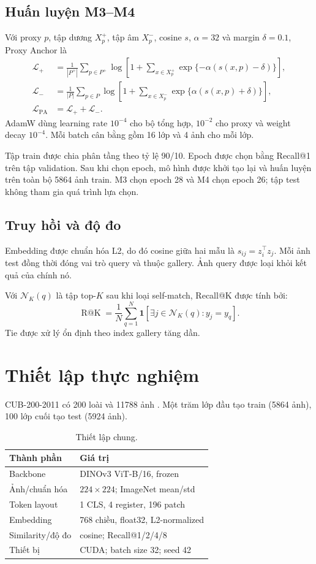 \documentclass[11pt,a4paper]{article}
\makeatletter
\newcommand{\Rk}{\operatorname{R@K}}
\makeatother
\begin{document}
\subsection{Huấn luyện M3--M4}
Với proxy $p$, tập dương $X_p^+$, tập âm $X_p^-$, cosine $s$, $\alpha=32$ và margin $\delta=0.1$, Proxy Anchor là
\begin{align}
\mathcal{L}_{+}
&=\frac{1}{|P^+|}\sum_{p\in P^+}\log\left[1+\sum_{x\in X_p^+}\exp\{-\alpha(s(x,p)-\delta)\}\right],\\
\mathcal{L}_{-}
&=\frac{1}{|P|}\sum_{p\in P}\log\left[1+\sum_{x\in X_p^-}\exp\{\alpha(s(x,p)+\delta)\}\right],\\
\mathcal{L}_{\mathrm{PA}}&=\mathcal{L}_{+}+\mathcal{L}_{-}.
\end{align}
AdamW dùng learning rate $10^{-4}$ cho bộ tổng hợp, $10^{-2}$ cho proxy và weight decay $10^{-4}$. Mỗi batch cân bằng gồm 16 lớp và 4 ảnh cho mỗi lớp.

Tập train được chia phân tầng theo tỷ lệ 90/10. Epoch được chọn bằng Recall@1 trên tập validation. Sau khi chọn epoch, mô hình được khởi tạo lại và huấn luyện trên toàn bộ \num{5864} ảnh train. M3 chọn epoch 28 và M4 chọn epoch 26; tập test không tham gia quá trình lựa chọn.

\subsection{Truy hồi và độ đo}
Embedding được chuẩn hóa L2, do đó cosine giữa hai mẫu là $s_{ij}=z_i^\top z_j$. Mỗi ảnh test đồng thời đóng vai trò query và thuộc gallery. Ảnh query được loại khỏi kết quả của chính nó.

Với $\mathcal{N}_K(q)$ là tập top-$K$ sau khi loại self-match, Recall@K được tính bởi:
\begin{equation}
\Rk=\frac{1}{N}\sum_{q=1}^{N}\mathbf{1}\left[\exists j\in\mathcal{N}_K(q):y_j=y_q\right].
\end{equation}
Tie được xử lý ổn định theo index gallery tăng dần.

\section{Thiết lập thực nghiệm}
CUB-200-2011 có 200 loài và \num{11788} ảnh \cite{wah2011cub}. Một trăm lớp đầu tạo train (\num{5864} ảnh), 100 lớp cuối tạo test (\num{5924} ảnh).

\begin{table}[htbp]
\centering
\caption{Thiết lập chung.}
\begin{tabular}{@{}ll@{}}
\toprule
Thành phần & Giá trị\\
\midrule
Backbone & DINOv3 ViT-B/16, frozen\\
Ảnh/chuẩn hóa & $224\times224$; ImageNet mean/std\\
Token layout & 1 CLS, 4 register, 196 patch\\
Embedding & 768 chiều, float32, L2-normalized\\
Similarity/độ đo & cosine; Recall@1/2/4/8\\
Thiết bị & CUDA; batch size 32; seed 42\\
\bottomrule
\end{tabular}
\end{table}
\end{document}
